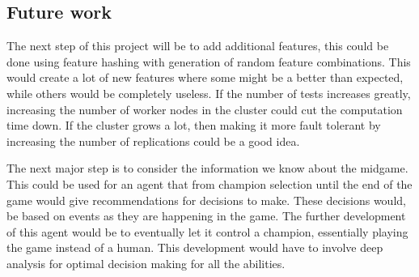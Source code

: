 \subsection{Future work}\label{sec:futurework}
The next step of this project will be to add additional features, this could be done using feature hashing with generation of random feature combinations. This would create a lot of new features where some might be a better than expected, while others would be completely useless.
If the number of tests increases greatly, increasing the number of worker nodes in the cluster could cut the computation time down. If the cluster grows a lot, then making it more fault tolerant by increasing the number of replications could be a good idea.

The next major step is to consider the information we know about the midgame. This could be used for an agent that from champion selection until the end of the game would give recommendations for decisions to make. These decisions would, be based on events as they are happening in the game. The further development of this agent would be to eventually let it control a champion, essentially playing the game instead of a human. This development would have to involve deep analysis for optimal decision making for all the abilities.


